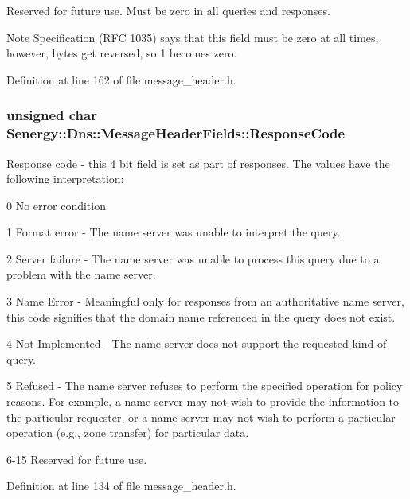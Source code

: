 Reserved for future use. Must be zero in all queries and responses. 

\begin{DoxyNote}{Note}
Specification (R\-F\-C 1035) says that this field must be zero at all times, however, bytes get reversed, so 1 becomes zero. 
\end{DoxyNote}


Definition at line 162 of file message\-\_\-header.\-h.

\hypertarget{struct_senergy_1_1_dns_1_1_message_header_fields_a2f42c94d4e50dd7a63b11c8b374597c4}{
\subsubsection[{Response\-Code}]{\setlength{\rightskip}{0pt plus 5cm}unsigned char Senergy\-::\-Dns\-::\-Message\-Header\-Fields\-::\-Response\-Code}}\label{struct_senergy_1_1_dns_1_1_message_header_fields_a2f42c94d4e50dd7a63b11c8b374597c4}


Response code -\/ this 4 bit field is set as part of responses. The values have the following interpretation\-: 

0 No error condition

1 Format error -\/ The name server was unable to interpret the query.

2 Server failure -\/ The name server was unable to process this query due to a problem with the name server.

3 Name Error -\/ Meaningful only for responses from an authoritative name server, this code signifies that the domain name referenced in the query does not exist.

4 Not Implemented -\/ The name server does not support the requested kind of query.

5 Refused -\/ The name server refuses to perform the specified operation for policy reasons. For example, a name server may not wish to provide the information to the particular requester, or a name server may not wish to perform a particular operation (e.\-g., zone transfer) for particular data.

6-\/15 Reserved for future use. 

Definition at line 134 of file message\-\_\-header.\-h.

